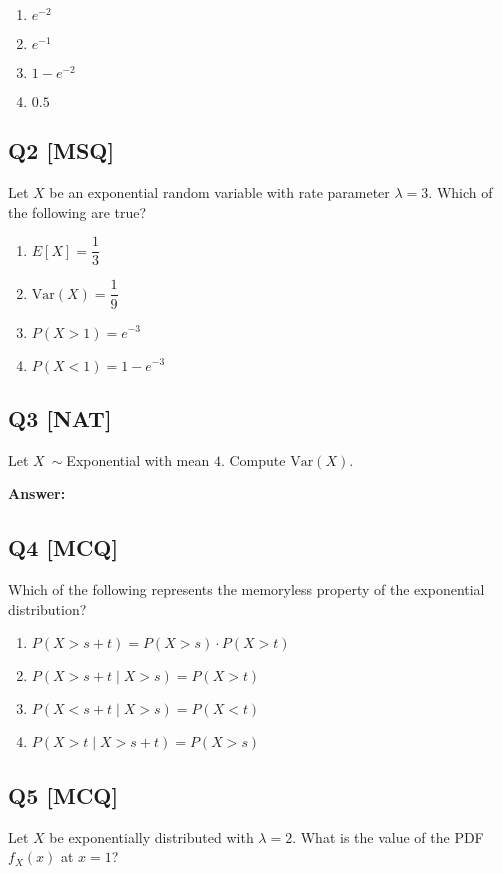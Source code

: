 \begin{enumerate}[label=(\alph*)]
\item $e^{-2}$
\item $e^{-1}$
\item $1 - e^{-2}$
\item $0.5$
\end{enumerate}

\subsection*{Q2 [MSQ]}
Let $X$ be an exponential random variable with rate parameter $\lambda = 3$. Which of the following are true?

\begin{enumerate}[label=(\alph*)]
\item $E[X] = \dfrac{1}{3}$
\item $\text{Var}(X) = \dfrac{1}{9}$
\item $P(X > 1) = e^{-3}$
\item $P(X < 1) = 1 - e^{-3}$
\end{enumerate}

\subsection*{Q3 [NAT]}
Let $X$$~\sim$Exponential with mean $4$. Compute $\text{Var}(X)$.

\noindent\textbf{Answer:} \underline{\hspace{3cm}}

\subsection*{Q4 [MCQ]}
Which of the following represents the memoryless property of the exponential distribution?

\begin{enumerate}[label=(\alph*)]
\item $P(X > s + t) = P(X > s) \cdot P(X > t)$
\item $P(X > s + t \mid X > s) = P(X > t)$
\item $P(X < s + t \mid X > s) = P(X < t)$
\item $P(X > t \mid X > s + t) = P(X > s)$
\end{enumerate}

\subsection*{Q5 [MCQ]}
Let $X$ be exponentially distributed with $\lambda = 2$. What is the value of the PDF $f_X(x)$ at $x = 1$?

